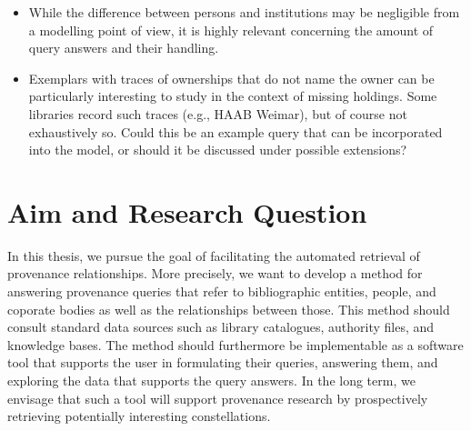 

%
\begin{itemize}
  \item
    While the difference between persons and institutions may be negligible
    from a modelling point of view, it is highly relevant concerning the
    amount of query answers and their handling.
  \item
    Exemplars with traces of ownerships that do not name the owner
    can be particularly interesting to study in the context of missing holdings.
    Some libraries record such traces (e.g., HAAB Weimar), but of course not exhaustively so.
    Could this be an example query that can be incorporated into the model,
    or should it be discussed under possible extensions?
\end{itemize}

\section{Aim and Research Question}
\label{sec:research_questions}

In this thesis, we pursue the goal of facilitating
the automated retrieval of provenance relationships.
More precisely,
we want to develop a method for answering provenance queries that refer to bibliographic entities, people, and coporate bodies
as well as the relationships between those. This method should consult standard data sources such as
library catalogues, authority files, and knowledge bases. The method should furthermore be implementable as a software tool
that supports the user in formulating their queries, answering them, and exploring the data that supports the query answers.
In the long term, we envisage that such a tool will support provenance research
by prospectively retrieving potentially interesting constellations.

